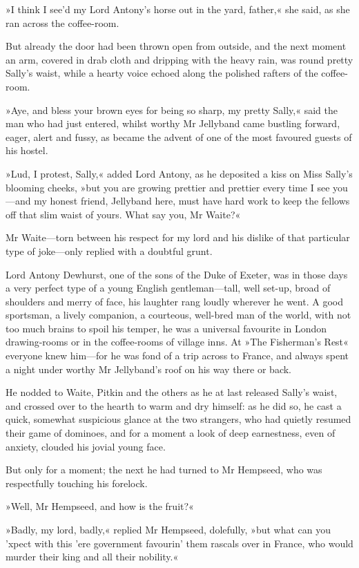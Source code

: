 »I think I see'd my Lord Antony's horse out in the yard, father,« she said, as she ran across the coffee-room.

But already the door had been thrown open from outside, and the next moment an arm, covered in drab cloth and dripping with the heavy rain, was round pretty Sally's waist, while a hearty voice echoed along the polished rafters of the coffee-room.

»Aye, and bless your brown eyes for being so sharp, my pretty Sally,« said the man who had just entered, whilst worthy Mr Jellyband came bustling forward, eager, alert and fussy, as became the advent of one of the most favoured guests of his hostel.

»Lud, I protest, Sally,« added Lord Antony, as he deposited a kiss on Miss Sally's blooming cheeks, »but you are growing prettier and prettier every time I see you—and my honest friend, Jellyband here, must have hard work to keep the fellows off that slim waist of yours. What say you, Mr Waite?«

Mr Waite—torn between his respect for my lord and his dislike of that particular type of joke—only replied with a doubtful grunt.

Lord Antony Dewhurst, one of the sons of the Duke of Exeter, was in those days a very perfect type of a young English gentleman—tall, well set-up, broad of shoulders and merry of face, his laughter rang loudly wherever he went. A good sportsman, a lively companion, a courteous, well-bred man of the world, with not too much brains to spoil his temper, he was a universal favourite in London drawing-rooms or in the coffee-rooms of village inns. At »The Fisherman's Rest« everyone knew him—for he was fond of a trip across to France, and always spent a night under worthy Mr Jellyband's roof on his way there or back.

He nodded to Waite, Pitkin and the others as he at last released Sally's waist, and crossed over to the hearth to warm and dry himself: as he did so, he cast a quick, somewhat suspicious glance at the two strangers, who had quietly resumed their game of dominoes, and for a moment a look of deep earnestness, even of anxiety, clouded his jovial young face.

But only for a moment; the next he had turned to Mr Hempseed, who was respectfully touching his forelock.

»Well, Mr Hempseed, and how is the fruit?«

»Badly, my lord, badly,« replied Mr Hempseed, dolefully, »but what can you 'xpect with this 'ere government favourin' them rascals over in France, who would murder their king and all their nobility.«

